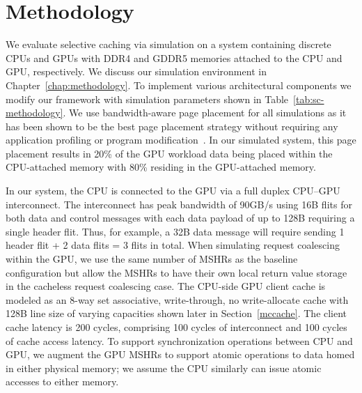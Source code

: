 \vspace{-.05in}
\section{Methodology}
\label{methodology}

We evaluate selective caching via simulation on a system containing discrete CPUs and GPUs with
DDR4 and GDDR5 memories attached to the CPU and GPU, respectively.  We discuss
our simulation environment in Chapter~\ref{chap:methodology}.
To implement various architectural components we modify our framework 
with simulation parameters shown in Table~\ref{tab:sc-methodology}.
We use bandwidth-aware page placement for all simulations as it has been
shown to be the best page placement strategy without requiring
any application profiling or program modification~\cite{Agarwal2015}. 
In our simulated system, this page placement results in 20\% of the
GPU workload data being placed within the CPU-attached memory with 80\% residing in the GPU-attached
memory.  

In our system, the CPU is connected to the GPU via a full duplex CPU--GPU
interconnect. The interconnect has peak bandwidth of 90GB/s using 16B flits for
both data and control messages with each data payload of up to 128B requiring a
single header flit.  Thus, for example, a 32B data message will require sending
1 header flit + 2 data flits = 3 flits in total.
When simulating request coalescing within the GPU, we use the same number of
MSHRs as the baseline configuration but allow the MSHRs to have their own local
return value storage in the cacheless request coalescing case.  The CPU-side GPU
client cache is modeled as an 8-way set associative, write-through, no
write-allocate cache with 128B line size of varying capacities shown later in
Section~\ref{mccache}. The client cache latency is 200 cycles, comprising 100
cycles of interconnect and 100 cycles of cache access latency.  To support
synchronization operations between CPU and GPU, we augment the GPU MSHRs to
support atomic operations to data homed in either physical memory; we assume the
CPU similarly can issue atomic accesses to either memory.

